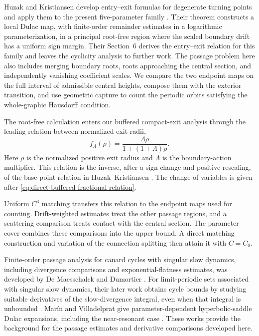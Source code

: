 Huzak and Kristiansen develop entry--exit formulas for degenerate turning
points and apply them to the present five-parameter family
\cite[Theorem~2.4 and \S6]{HK2026}. Their theorem constructs a local Dulac
map, with finite-order remainder estimates in a logarithmic parameterization,
in a principal root-free region where the scaled boundary drift has a uniform
sign margin. Their Section~6 derives the entry--exit relation for this
family and leaves the cyclicity analysis to further work. The passage
problem here also includes merging boundary
roots, roots approaching the central section, and independently
vanishing coefficient scales. We compare the two endpoint maps on the
full interval of admissible central heights, compose them with the
exterior transition, and use geometric capture to count the periodic
orbits satisfying the whole-graphic Hausdorff condition.

The root-free calculation enters our buffered compact-exit analysis
through the leading relation between normalized exit radii,
\[
 f_\Lambda(\rho)=\frac{\Lambda\rho}{1+(1+\Lambda)\rho}.
\]
Here \(\rho\) is the normalized positive exit radius and \(\Lambda\)
is the boundary-action multiplier. This relation is the inverse,
after a sign change and positive rescaling, of the base-point relation
in Huzak--Kristiansen \cite[(2.13) and (6.8)]{HK2026}.
The change of variables is given after
\eqref{eq:direct-buffered-fractional-relation}.

Uniform \(C^3\) matching transfers this relation to the endpoint maps
used for counting. Drift-weighted estimates treat the other passage
regions, and a scattering comparison treats contact with the central
section. The parameter cover combines these comparisons into the
upper bound. A direct matching construction and variation of the
connection splitting then attain it with \(C=C_0\).

Finite-order passage analysis for canard cycles with singular slow dynamics,
including divergence comparisons and exponential-flatness estimates, was
developed by De Maesschalck and Dumortier \cite{DMD2008}. For limit-periodic
sets associated with singular slow dynamics, their later work obtains
cycle bounds by studying suitable derivatives of the slow-divergence integral,
even when that integral is unbounded \cite{DMD2011}.
Mar\'in and Villadelprat give parameter-dependent
hyperbolic-saddle Dulac expansions, including the near-resonant case
\cite{MV2024}. These works provide the background for the passage
estimates and derivative comparisons developed here.

